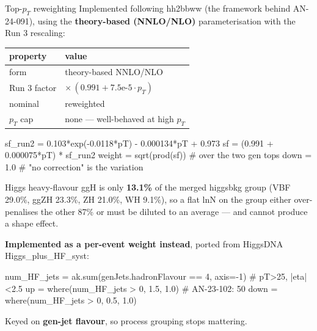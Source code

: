 \documentclass[aspectratio=169,10pt]{beamer}
\newcommand{\code}[1]{{\ttfamily\small\colorbox{codebg}{#1}}}
\begin{document}
\begin{frame}[fragile]{Top-$p_T$ reweighting}
{\small Implemented following \code{hh2bbww} (the framework behind AN-24-091), using
the \textbf{theory-based (NNLO/NLO)} parameterisation with the Run 3 rescaling:}
\vspace{0.2em}
\begin{center}
\small
\begin{tabular}{ll}
\toprule
property & value \\
\midrule
form & theory-based NNLO/NLO \\
Run 3 factor & $\times\,(0.991 + 7.5\text{e-}5\cdot p_T)$ \\
nominal & reweighted \\
$p_T$ cap & none --- well-behaved at high $p_T$ \\
\bottomrule
\end{tabular}
\end{center}
\vspace{0.2em}
\begin{semiverbatim}\scriptsize
sf_run2 = 0.103*exp(-0.0118*pT) - 0.000134*pT + 0.973
sf      = (0.991 + 0.000075*pT) * sf_run2
weight  = sqrt(prod(sf))       # over the two gen tops
down    = 1.0                  # "no correction" is the variation
\end{semiverbatim}
\end{frame}

\begin{frame}[fragile]{Higgs heavy-flavour}
{\small ggH is only \textbf{13.1\%} of the merged \code{higgsbkg} group (VBF 29.0\%,
ggZH 23.3\%, ZH 21.0\%, WH 9.1\%), so a flat lnN on the group either over-penalises
the other 87\% or must be diluted to an average --- and cannot produce a shape effect.}
\vspace{0.3em}

{\small \textbf{Implemented as a per-event weight instead}, ported from HiggsDNA
\code{Higgs\_plus\_HF\_syst}:}
\begin{semiverbatim}\scriptsize
num_HF_jets = ak.sum(genJets.hadronFlavour == 4, axis=-1)   # pT>25, |eta|<2.5
up   = where(num_HF_jets > 0, 1.5, 1.0)     # AN-23-102: 50%
down = where(num_HF_jets > 0, 0.5, 1.0)
\end{semiverbatim}
\vspace{0.2em}
Keyed on \textbf{gen-jet flavour}, so process grouping stops mattering.
\end{frame}
\end{document}
